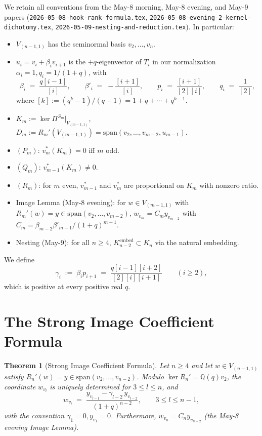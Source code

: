 \documentclass[11pt]{article}
\newtheorem{theorem}{Theorem}
\theoremstyle{definition}
\begin{document}
We retain all conventions from the May-8 morning, May-8 evening, and
May-9 papers (\texttt{2026-05-08-hook-rank-formula.tex},
\texttt{2026-05-08-evening-2-kernel-dichotomy.tex},
\texttt{2026-05-09-nesting-and-reduction.tex}). In particular:
\begin{itemize}[topsep=0.3em,itemsep=0.2em,leftmargin=2em]
\item $V_{(n-1,1)}$ has the seminormal basis $v_2,\ldots,v_n$.
\item $u_i = v_i + \beta_i v_{i+1}$ is the $+q$-eigenvector of $T_i$
  in our normalization $\alpha_i = 1, q_i = 1/(1+q)$, with
  \[
     \beta_i \;=\; \frac{q[i-1]}{[i]}, \qquad
     \beta'_i \;=\; -\frac{[i+1]}{[i]}, \qquad
     p_i \;=\; \frac{[i+1]}{[2][i]}, \qquad
     q_i \;=\; \frac{1}{[2]},
  \]
  where $[k] := (q^k-1)/(q-1) = 1 + q + \cdots + q^{k-1}$.
\item $K_m := \ker\Pi^{S_m}|_{V_{(m-1,1)}}$, $D_m := R_m'(V_{(m-1,1)})
  = \mathrm{span}(v_2,\ldots,v_{m-2}, u_{m-1})$.
\item $(P_m)$: $v_m^*(K_m) = 0$ iff $m$ odd.
\item $(Q_m)$: $v_{m-1}^*(K_m) \neq 0$.
\item $(R_m)$: for $m$ even, $v_{m-1}^*$ and $v_m^*$ are proportional
  on $K_m$ with nonzero ratio.
\item Image Lemma (May-8 evening): for $w \in V_{(m-1,1)}$ with
  $R_m'(w) = y \in \mathrm{span}(v_2,\ldots,v_{m-2})$, $w_{v_m} = C_m
  y_{v_{m-2}}$ with $C_m = \beta_{m-2}\beta'_{m-1}/(1+q)^{m-1}$.
\item Nesting (May-9): for all $n \ge 4$, $K_{n-2}^{\mathrm{embed}}
  \subset K_n$ via the natural embedding.
\end{itemize}

We define
\[
   \gamma_i \;:=\; \beta_i p_{i+1} \;=\; \frac{q[i-1][i+2]}{[2][i][i+1]}
   \qquad (i \ge 2),
\]
which is positive at every positive real $q$.

\section{The Strong Image Coefficient Formula}\label{sec:strong-image}

\begin{theorem}[Strong Image Coefficient Formula]\label{thm:strong-image}
Let $n \ge 4$ and let $w \in V_{(n-1,1)}$ satisfy
$R_n'(w) = y \in \mathrm{span}(v_2,\ldots,v_{n-2})$.  Modulo
$\ker R_n' = \mathbb{Q}(q) v_2$, the coordinate $w_{v_l}$ is uniquely
determined for $3 \le l \le n$, and
\begin{equation}\label{eq:strong-image}
   w_{v_l} \;=\; \frac{y_{v_{l-1}} - \gamma_{l-2}\, y_{v_{l-2}}}{(1+q)^{n-2}},
   \qquad 3 \le l \le n-1,
\end{equation}
with the convention $\gamma_1 = 0, y_{v_1} = 0$.  Furthermore,
$w_{v_n} = C_n y_{v_{n-2}}$ (the May-8 evening Image Lemma).
\end{theorem}
\end{document}
